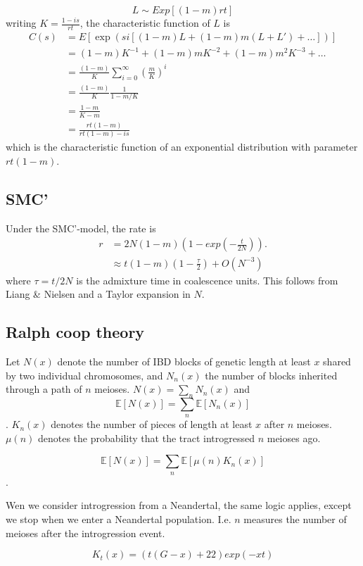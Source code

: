 \documentclass[10pt,a4paper]{article}
\newcommand{\BE}[1]{\mathbb{E}\left[#1\right]}
\begin{document}
\begin{equation}
L \sim Exp[(1-m)rt]
\end{equation}
writing $K = \frac{1-is}{rt}$, the characteristic function of $L$ is
\begin{align}
C(s) &= E[\exp(si [(1-m)L + (1-m)m (L+L')+ \dots  ] )]\nonumber\\
&=(1-m) K^{-1} + (1-m)m K^{-2} +(1-m)m^2 K^{-3} + \dots\nonumber\\
&=\frac{(1-m)}{K} \sum_{i=0}^\infty \left(\frac{m}{K}\right)^{i} \nonumber\\
&= \frac{(1-m)}{K} \frac{1}{1 - m/K}\nonumber\\
&= \frac{1-m}{K-m}\nonumber\\
&= \frac{rt(1-m)}{rt (1-m) - is}\nonumber
\end{align}
which is the characteristic function of an exponential distribution with parameter $rt(1-m)$.

\subsection{SMC'}
Under the SMC'-model, the rate is 
\begin{align}
r &= 2 N (1-m) \left(1 - exp\left({-\frac{t}{2N}}\right)\right).\\
& \approx t (1-m) \left( 1- \frac{\tau}{2}\right) + O\left(N^{-3}\right)
\end{align}
where $\tau = t/2N$ is the admixture time in coalescence units. This follows from Liang \& Nielsen and a Taylor expansion in $N$.


\subsection{Ralph coop theory}
Let $N(x)$ denote the number of IBD blocks of genetic length at least $x$ shared by two individual chromosomes, and $N_n(x)$ the number of blocks inherited through a path of $n$ meioses. $N(x) = \sum_n N_n(x)$ and
$$\BE{N(x)} = \sum_n \BE{N_n(x)}$$. $K_n(x)$ denotes the number of pieces of length at least $x$ after $n$ meioses. $\mu(n)$ denotes the probability that the tract introgressed $n$ meioses ago. 

$$\BE{N(x)} = \sum_n \BE{\mu(n) K_n (x)}$$.

Wen we consider introgression from a Neandertal, the same logic applies, except we stop when we enter a Neandertal population. I.e. $n$ measures the number of meioses after the introgression event.

$$K_t(x) = (t(G - x) +22) exp(-x t)$$
\end{document}

